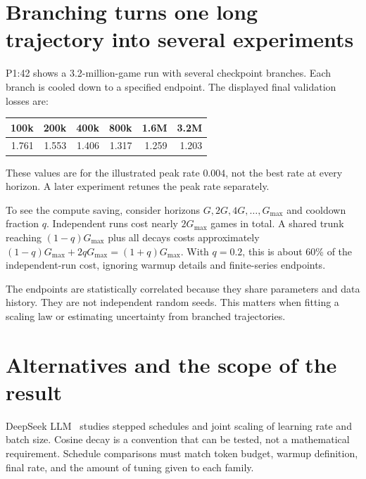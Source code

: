 \section{Branching turns one long trajectory into several experiments}
P1:42 shows a 3.2-million-game run with several checkpoint branches. Each branch is cooled down to a specified endpoint. The displayed final validation losses are:
\begin{center}
\begin{tabular}{rrrrrr}\toprule
100k & 200k & 400k & 800k & 1.6M & 3.2M\\\midrule
1.761 & 1.553 & 1.406 & 1.317 & 1.259 & 1.203\\\bottomrule
\end{tabular}
\end{center}
These values are for the illustrated peak rate $0.004$, not the best rate at every horizon. A later experiment retunes the peak rate separately.

To see the compute saving, consider horizons $G,2G,4G,\ldots,G_{\max}$ and cooldown fraction $q$. Independent runs cost nearly $2G_{\max}$ games in total. A shared trunk reaching $(1-q)G_{\max}$ plus all decays costs approximately $(1-q)G_{\max}+2qG_{\max}=(1+q)G_{\max}$. With $q=0.2$, this is about 60\% of the independent-run cost, ignoring warmup details and finite-series endpoints.

The endpoints are statistically correlated because they share parameters and data history. They are not independent random seeds. This matters when fitting a scaling law or estimating uncertainty from branched trajectories.

\section{Alternatives and the scope of the result}
DeepSeek LLM~\cite{deepseekllm} studies stepped schedules and joint scaling of learning rate and batch size. Cosine decay is a convention that can be tested, not a mathematical requirement. Schedule comparisons must match token budget, warmup definition, final rate, and the amount of tuning given to each family.

\FloatBarrier
